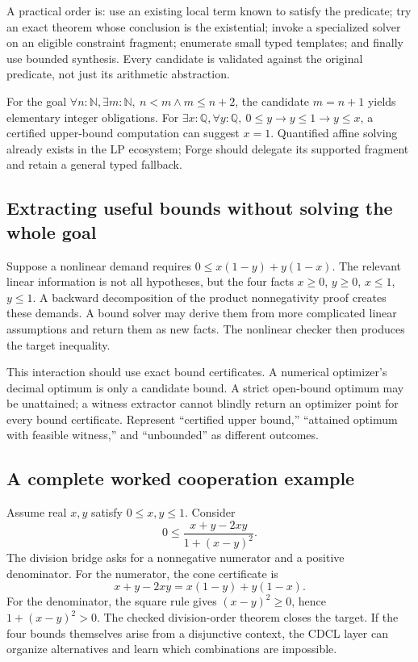 \documentclass[11pt,letterpaper]{article}
\newcommand{\Q}{\mathbb{Q}}
\newcommand{\N}{\mathbb{N}}
\theoremstyle{definition}\newtheorem{definition}[proposition]{Definition}
\begin{document}
A practical order is: use an existing local term known to satisfy the predicate; try an exact theorem whose conclusion is the existential; invoke a specialized solver on an eligible constraint fragment; enumerate small typed templates; and finally use bounded synthesis. Every candidate is validated against the original predicate, not just its arithmetic abstraction.

For the goal $\forall n:\N,\exists m:\N,\ n<m\land m\le n+2$, the candidate $m=n+1$ yields elementary integer obligations. For $\exists x:\Q,\forall y:\Q,\ 0\le y\to y\le1\to y\le x$, a certified upper-bound computation can suggest $x=1$. Quantified affine solving already exists in the LP ecosystem; Forge should delegate its supported fragment and retain a general typed fallback.~\cite{lpblog}

\subsection{Extracting useful bounds without solving the whole goal}
Suppose a nonlinear demand requires $0\le x(1-y)+y(1-x)$. The relevant linear information is not all hypotheses, but the four facts $x\ge0$, $y\ge0$, $x\le1$, $y\le1$. A backward decomposition of the product nonnegativity proof creates these demands. A bound solver may derive them from more complicated linear assumptions and return them as new facts. The nonlinear checker then produces the target inequality.

This interaction should use exact bound certificates. A numerical optimizer's decimal optimum is only a candidate bound. A strict open-bound optimum may be unattained; a witness extractor cannot blindly return an optimizer point for every bound certificate. Represent ``certified upper bound,'' ``attained optimum with feasible witness,'' and ``unbounded'' as different outcomes.

\subsection{A complete worked cooperation example}
Assume real $x,y$ satisfy $0\le x,y\le1$. Consider
\[
0\le\frac{x+y-2xy}{1+(x-y)^2}.
\]
The division bridge asks for a nonnegative numerator and a positive denominator. For the numerator, the cone certificate is
\[
x+y-2xy=x(1-y)+y(1-x).
\]
For the denominator, the square rule gives $(x-y)^2\ge0$, hence $1+(x-y)^2>0$. The checked division-order theorem closes the target. If the four bounds themselves arise from a disjunctive context, the CDCL layer can organize alternatives and learn which combinations are impossible.
\end{document}
